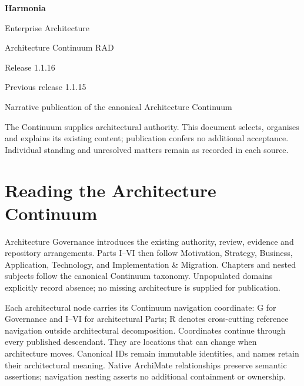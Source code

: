 \documentclass[10pt,a4paper,oneside,headings=small]{scrreprt}
\begin{document}
\hypersetup{pageanchor=false}
\begin{titlepage}
\vspace*{24mm}
{\Huge\bfseries\color{Ink} Harmonia\par}
\vspace{8mm}
{\LARGE Enterprise Architecture\par Architecture Continuum RAD\par}
\vspace{12mm}
{\Large Release 1.1.16\par Previous release 1.1.15\par}
\vfill
Narrative publication of the canonical Architecture Continuum\par
\vspace{8mm}
The Continuum supplies architectural authority. This document selects, organises
and explains its existing content; publication confers no additional acceptance.
Individual standing and unresolved matters remain as recorded in each source.
\end{titlepage}
\hypersetup{pageanchor=true}
\tableofcontents
\chapter*{Reading the Architecture Continuum}
Architecture Governance introduces the existing authority, review, evidence and
repository arrangements. Parts I--VI then follow Motivation, Strategy, Business,
Application, Technology, and Implementation \& Migration. Chapters and nested
subjects follow the canonical Continuum taxonomy. Unpopulated domains explicitly
record absence; no missing architecture is supplied for publication.

Each architectural node carries its Continuum navigation coordinate: G for
Governance and I--VI for architectural Parts; R denotes cross-cutting reference
navigation outside architectural decomposition. Coordinates continue through every
published descendant. They are locations that can change when architecture moves.
Canonical IDs remain immutable identities, and names retain their architectural
meaning. Native ArchiMate relationships preserve semantic assertions; navigation
nesting asserts no additional containment or ownership.
\end{document}
